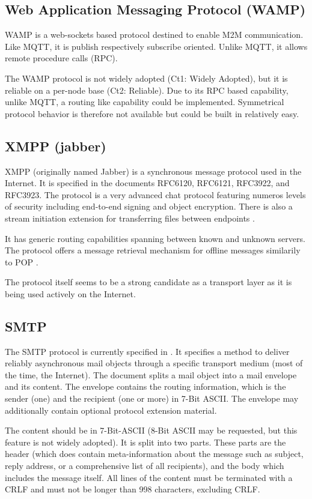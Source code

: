 \subsection{Web Application Messaging Protocol (WAMP)}
WAMP is a web-sockets based protocol destined to enable M2M communication. Like MQTT, it is publish respectively subscribe oriented. Unlike MQTT, it allows remote procedure calls (RPC).

The WAMP protocol is not widely adopted (Ct1: Widely Adopted), but it is reliable on a per-node base (Ct2: Reliable). Due to its RPC based capability, unlike MQTT, a routing like capability could be implemented. Symmetrical protocol behavior is therefore not available but could be built in relatively easy.

\subsection{XMPP (jabber)}
XMPP (originally named Jabber) is a synchronous message protocol used in the Internet. It is specified in the documents RFC6120\cite{RFC6120}, RFC6121\cite{RFC6120}, RFC3922\cite{RFC3922}, and RFC3923\cite{RFC3923}. The protocol is a very advanced chat protocol featuring numeros levels of security including end-to-end signing and object encryption\cite{RFC3923}. There is also a stream initiation extension for transferring files between endpoints \cite{xep0096}.

It has generic routing capabilities spanning between known and unknown servers. The protocol offers a message retrieval mechanism for offline messages similarily to POP \cite{xep0013}.

The protocol itself seems to be a strong candidate as a transport layer as it is being used actively on the Internet.

\subsection{SMTP}
The SMTP protocol is currently specified in \cite{RFC5321}. It specifies a method to deliver reliably asynchronous mail objects through a specific transport medium (most of the time, the Internet). The document splits a mail object into a mail envelope and its content. The envelope contains the routing information, which is the sender (one) and the recipient (one or more) in 7-Bit ASCII. The envelope may additionally contain optional protocol extension material. 

The content should be in 7-Bit-ASCII (8-Bit ASCII may be requested, but this feature is not widely adopted). It is split into two parts. These parts are the header (which does contain meta-information about the message such as subject, reply address, or a comprehensive list of all recipients), and the body which includes the message itself. All lines of the content must be terminated with a CRLF and must not be longer than 998 characters, excluding CRLF.

